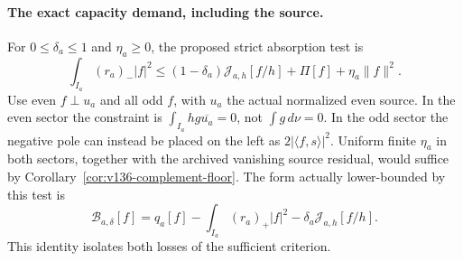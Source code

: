\documentclass[11pt]{article}
\theoremstyle{remark}
\begin{document}
\paragraph{The exact capacity demand, including the source.}
For $0\le\delta_a\le1$ and $\eta_a\ge0$, the proposed strict absorption test is
\begin{equation}\label{eq:v150-capacity-demand}
 \int_{I_a}(r_a)_-|f|^2\le
 (1-\delta_a)\mathcal J_{a,h}[f/h]+\Pi[f]+\eta_a\|f\|^2.
\end{equation}
Use even $f\perp u_a$ and all odd $f$, with $u_a$ the actual normalized
even source. In the even sector the constraint is
$\int_{I_a}h g\overline{u_a}=0$, not $\int g\,d\nu=0$.
In the odd sector the negative pole can instead be placed on the left
as $2|\langle f,s\rangle|^2$. Uniform finite $\eta_a$ in both sectors,
together with the archived vanishing source residual, would suffice
by Corollary~\ref{cor:v136-complement-floor}.
The form actually lower-bounded by this test is
\begin{equation}\label{eq:v150-budget-form}
 \mathcal B_{a,\delta}[f]
 =q_a[f]-\int_{I_a}(r_a)_+|f|^2
                  -\delta_a\mathcal J_{a,h}[f/h].
\end{equation}
This identity isolates both losses of the sufficient criterion.
\end{document}
